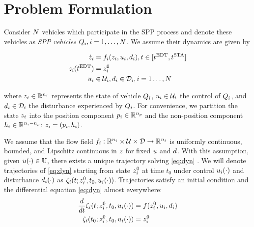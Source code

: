 \section{Problem Formulation \label{sec:formulation}}
Consider $N$ vehicles which participate in the SPP process and denote these vehicles as \textit{SPP vehicles} $Q_{i}, i = 1, \ldots, N$. We assume their dynamics are given by

\begin{equation}
\label{eq:dyn}
\begin{aligned}
\dot\state_i &= \fdyn_i(\state_i, \ctrl_i, \dstb_i), t \in [\edt, \sta] \\
\state_i(\edt) &= \state^0_i \\
\ctrl_i &\in \cset_i, \dstb_i \in \dset_i, i = 1 \ldots, \N
\end{aligned}
\end{equation}

\noindent where $z_i \in \mathbb{R}^{n_i}$ represents the state of vehicle $Q_{i}$, $u_i \in \mathcal{U}_i$ the control of $Q_{i}$, and $d_i \in \mathcal{D}_i$ the disturbance experienced by $Q_{i}$. For convenience, we partition the state $z_i$ into the position component $p_i \in \mathbb{R}^{n_p}$ and the non-position component $h_i \in \mathbb{R}^{n_i - n_p}$: $z_i = (p_i, h_i)$.

We assume that the flow field $f_i: \mathbb{R}^{n_i}\times\mathcal{U}\times\mathcal{D} \rightarrow \mathbb{R}^{n_i}$ is uniformly continuous, bounded, and Lipschitz continuous in $z$ for fixed $u$ and $d$. With this assumption, given $u(\cdot) \in \mathbb{U}$, there exists a unique trajectory solving \eqref{eq:dyn} \cite{}. We will denote trajectories of \eqref{eq:dyn} starting from state $z^0_i$ at time $t_0$ under control $u_i(\cdot)$ and disturbance $d_i(\cdot)$ as $\zeta_i(t; z^0_i, t_0, u_i(\cdot))$. Trajectories satisfy an initial condition and the differential equation \eqref{eq:dyn} almost everywhere:
\begin{equation}
\begin{aligned}
\frac{d}{dt}\zeta_i(t; z^0_i, t_0, u_i(\cdot)) &= f(z^0_i, u_i, d_i) \\
\zeta_i(t_0; z^0_i, t_0, u_i(\cdot)) &= z^0_i
\end{aligned}
\end{equation}

